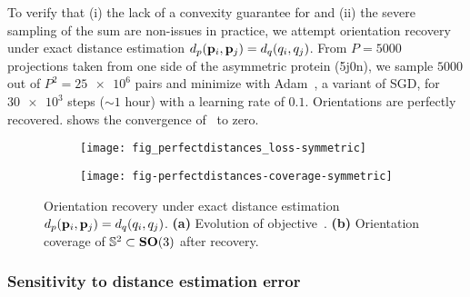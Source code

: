 
To verify that (i) the lack of a convexity guarantee for  and (ii) the severe sampling of the sum are non-issues in practice, we attempt orientation recovery under exact distance estimation $d_p(\mathbf{p}_i, \mathbf{p}_j) = d_q(q_i, q_j)$.
From $P=5000$ projections taken from one side of the asymmetric protein (5j0n), we sample $5000$ out of $P^2 = \num{25e6}$ pairs and minimize  with Adam~\cite{kingma2014adam}, a variant of SGD, for $\num{30e3}$ steps ($\sim 1$ hour) with a learning rate of $0.1$.
Orientations are perfectly recovered.
 shows the convergence of~ to zero.

\begin{figure}
    \centering
    \begin{subfigure}[b]{0.58\textwidth}
        \texttt{[image: fig\_perfectdistances\_loss-symmetric]}
        \caption{}
    \end{subfigure}
    \hfill
    \begin{subfigure}[b]{0.40\textwidth}
    \centering
        \texttt{[image: fig-perfectdistances-coverage-symmetric]}
        \caption{}
    \end{subfigure}
    \caption{
        Orientation recovery under exact distance estimation $d_p(\mathbf{p}_i, \mathbf{p}_j) = d_q(q_i, q_j)$.
        \textbf{(a)} Evolution of objective~.
        \textbf{(b)} Orientation coverage of $\mathbb{S}^2 \subset \mathrm{\mathbf{SO}}(3)$ after recovery.
}
    \label{fig:minim-loss-perfect-distances}
\end{figure}

\subsubsection{Sensitivity to distance estimation error}\label{sec:results:orientation-recovery:sensitivity}


